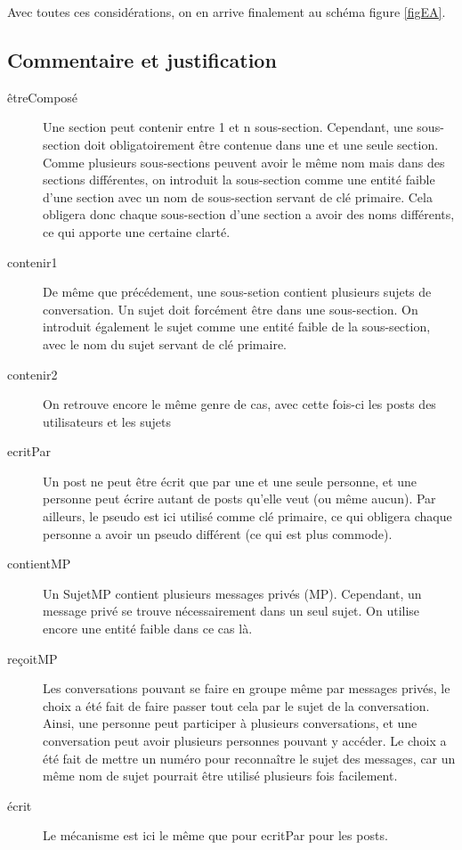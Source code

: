\bigskip
Avec toutes ces considérations, on en arrive finalement au schéma figure \ref{figEA}.\\


\clearpage
\subsection{Commentaire et justification}
\begin{description}
	\item[êtreComposé] Une section peut contenir entre 1 et n sous-section. Cependant, une sous-section doit obligatoirement être contenue dans une et une seule section. Comme plusieurs sous-sections peuvent avoir le même nom mais dans des sections différentes, on introduit la sous-section comme une entité faible d'une section avec un nom de sous-section servant de clé primaire. Cela obligera donc chaque sous-section d'une section a avoir des noms différents, ce qui apporte une certaine clarté. 
	\item[contenir1] De même que précédement, une sous-setion contient plusieurs sujets de conversation. Un sujet doit forcément être dans une sous-section. On introduit également le sujet comme une entité faible de la sous-section, avec le nom du sujet servant de clé primaire.
	\item[contenir2] On retrouve encore le même genre de cas, avec cette fois-ci les posts des utilisateurs et les sujets
	\item[ecritPar] Un post ne peut être écrit que par une et une seule personne, et une personne peut écrire autant de posts qu'elle veut (ou même aucun). Par ailleurs, le pseudo est ici utilisé comme clé primaire, ce qui obligera chaque personne a avoir un pseudo différent (ce qui est plus commode).
	\item[contientMP] Un SujetMP contient plusieurs messages privés (MP). Cependant, un message privé se trouve nécessairement dans un seul sujet. On utilise encore une entité faible dans ce cas là.
	\item[reçoitMP] Les conversations pouvant se faire en groupe même par messages privés, le choix a été fait de faire passer tout cela par le sujet de la conversation. Ainsi, une personne peut participer à plusieurs conversations, et une conversation peut avoir plusieurs personnes pouvant y accéder. Le choix a été fait de mettre un numéro pour reconnaître le sujet des messages, car un même nom de sujet pourrait être utilisé plusieurs fois facilement.
	\item[écrit] Le mécanisme est ici le même que pour ecritPar pour les posts.

\end{description}
